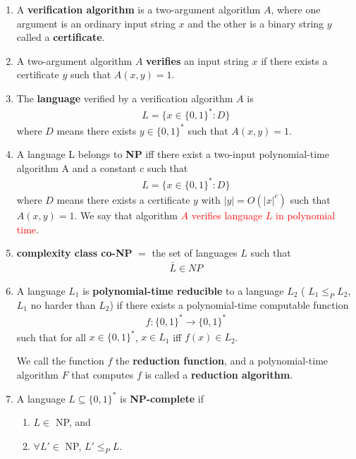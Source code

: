 \documentclass{article}
\begin{document}
\begin{enumerate}
    \item A \textbf{verification algorithm} is a two-argument algorithm $A$, where one argument is an ordinary input string $x$ and the other is a binary string  $y$ called a \textbf{certificate}. 
    \item A two-argument algorithm $A$ \textbf{verifies} an input string $x$ if there exists a certificate $y$ such that $A(x, y) = 1$. 
    \item The \textbf{language} verified by a verification algorithm $A$ is 
    \begin{align*}
        L = \{ x \in \{0, 1\}^* : D\}
    \end{align*}
    where $D$ means there exists $y \in \{0, 1\}^*$ such that $A(x, y) = 1$.
    \item A language L belongs to \textbf{NP} iff there exist a two-input polynomial-time algorithm A and a constant c such that 
    \begin{align*}
        L = \{ x \in \{0, 1\}^* : D\}
    \end{align*}
    where $D$ means there exists a certificate $y$ with $|y| = O(|x|^c)$ such that $A(x, y) = 1$. We say that algorithm \textcolor{red}{$A$ verifies language $L$ in polynomial time}.
    \item \textbf{complexity class co-NP} $=$ the set of languages $L$ such that
    \begin{align*}
        \bar{L} \in NP
    \end{align*}
    \item A language $L_1$ is \textbf{polynomial-time reducible} to a language $L_2$ ( $L_1 \le_P L_2$, $L_1$ no harder than $L_2$) if there exists a polynomial-time computable function  
    \begin{align*}
        f : \{0, 1\}^* \rightarrow \{0,1\}^*
    \end{align*} 
    such that for all $x \in \{0, 1\}^*$,  $x \in L_1$  iff  $f (x) \in L_2$. 
    
    We call the function $f$ the \textbf{reduction function}, and a polynomial-time algorithm $F$ that computes $f$  is called a \textbf{reduction algorithm}.
    \item A language $L \subseteq \{0, 1\}^*$ is \textbf{NP-complete} if
    \begin{enumerate}
        \item $L \in$ NP, and
        \item $\forall L' \in $ NP, $L' \le_P L$.
    \end{enumerate}    
\end{enumerate}
\end{document}
